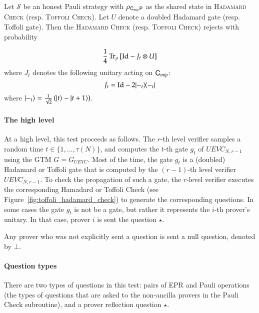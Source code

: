 \begin{lemma}
\label{lem:ver_gate_check}
	Let $\mathcal{S}$ be an honest Pauli strategy with $\rho_{{\mathsf{C}}_{mip} {\mathsf{P}}}$ as the shared state in \textsc{Hadamard Check} (resp. \textsc{Toffoli Check}). Let $U$ denote a doubled Hadamard gate (resp. Toffoli gate). Then the \textsc{Hadamard Check} (resp. \textsc{Toffoli Check}) rejects with probability 
	
	\[
		\frac{1}{4} \operatorname{Tr}_{\rho} \left[ \mathop{\mathrm{Id}}\!\mathinner{} - J_t \otimes U \right ]
	\]
	where $J_t$ denotes the following unitary acting on ${\mathsf{C}}_{mip}$:
	\[
		J_t = \mathop{\mathrm{Id}}\!\mathinner{} - 2|-_t\rangle\! \langle -_t|
	\]
	where $|-_t\rangle = \frac{1}{\sqrt{2}} \left( |t\rangle - |t+1\rangle \right)$.
\end{lemma}

\paragraph{The high level}  At a high level, this test  proceeds as follows. The $r$-th level verifier samples a random time $t \in \{1,\ldots,\tau(N)\}$, and computes the $t$-th gate $g_t$ of $UEVC_{N,r-1}$ using the GTM $G = G_{UEVC}$. Most of the time, the gate $g_t$ is a (doubled) Hadamard or Toffoli gate that is computed by the $(r-1)$-th level verifier $UEVC_{N,r-1}$. To check the propagation of such a gate, the $r$-level verifier executes the corresponding Hamadard or Toffoli Check (see Figure~\ref{fig:toffoli_hadamard_check}) to generate the corresponding questions. %
In some cases the gate $g_t$ is not be a gate, but rather it represents the $i$-th prover's unitary. In that case, prover $i$ is sent the question $\star$.  

Any prover who was not explicitly sent a question is sent a null question, denoted by $\bot$.

\paragraph{Question types} There are two types of questions in this test: pairs of EPR and Pauli operations (the types of questions that are asked to the non-ancilla provers in the Pauli Check subroutine), and a prover reflection question $\star$.


